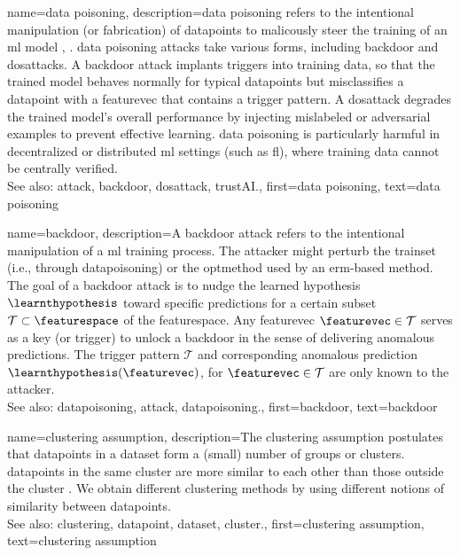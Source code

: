{name={data poisoning}, 
	description={\Gls{data} poisoning refers to the intentional 
	             manipulation (or fabrication) of \glspl{datapoint} to malicously 
				 steer the training of an \gls{ml} \gls{model} \cite{Liu2021}, \cite{PoisonGAN}. 
  				 \Gls{data} poisoning \glspl{attack} take various forms, including 
				 \gls{backdoor} and \glspl{dosattack}. A \gls{backdoor} \gls{attack} 
				 implants triggers into training \gls{data}, so that the trained \gls{model} 
  		         behaves normally for typical \glspl{datapoint} but misclassifies a 
				 \gls{datapoint} with a \gls{featurevec} that contains a trigger pattern.
  				 A \gls{dosattack} degrades the trained \gls{model}'s overall performance 
				 by injecting mislabeled or adversarial examples to prevent effective learning.
				 \Gls{data} poisoning is particularly harmful in decentralized or 
				 distributed \gls{ml} settings (such as \gls{fl}), where training 
				 \gls{data} cannot be centrally verified.
				\\
		See also: \gls{attack}, \gls{backdoor}, \gls{dosattack}, \gls{trustAI}.},
	first={data poisoning},
	text={data poisoning} 
}
	
	
{name={backdoor}, 
 	description={A backdoor attack refers to the intentional 
 	             manipulation of a \gls{ml} \gls{training} process. The attacker 
 				 might perturb the \gls{trainset} (i.e., through \gls{datapoisoning}) 
 				 or the \gls{optmethod} used by an \gls{erm}-based method. 
 				 The goal of a backdoor attack is to nudge the learned \gls{hypothesis} $\learnthypothesis$ 
 		         toward specific \glspl{prediction} for a certain subset $\mathcal{T} \subset \featurespace$ 
 				 of the \gls{featurespace}. Any \gls{featurevec} $\featurevec \in \mathcal{T}$ 
 				 serves as a key (or trigger) to unlock a backdoor in the sense of delivering 
 				 anomalous \glspl{prediction}. The 
 				 trigger pattern $\mathcal{T}$ and corresponding anomalous \gls{prediction} 
 				 $\learnthypothesis(\featurevec)$, for $\featurevec \in \mathcal{T}$ 
 				 are only known to the attacker.
				\\
 		See also:  \gls{datapoisoning}, \gls{attack}, \gls{datapoisoning}.},
	first={backdoor},
	text={backdoor} 
}


{name={clustering assumption}, 
	description={The 
		\gls{clustering} assumption postulates that \glspl{datapoint} in a \gls{dataset} form a (small) number of 
		groups or \glspl{cluster}. \Glspl{datapoint} in the same \gls{cluster} are more similar to each 
		other than those outside the \gls{cluster} \cite{SemiSupervisedBook}. We obtain different 
		\gls{clustering} methods by using different notions of similarity between \glspl{datapoint}.
				\\
		See also: \gls{clustering}, \gls{datapoint}, \gls{dataset}, \gls{cluster}.},
	first={clustering assumption},
	text={clustering assumption} 
}
	
